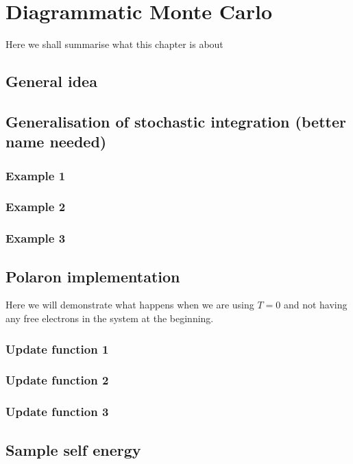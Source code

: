 \documentclass[12pt]{report}
\newcommand{\todo}[1]{{\leavevmode\color{todo}#1}}
\begin{document}
\chapter{Diagrammatic Monte Carlo}

\todo{Here we shall summarise what this chapter is about}

\section{General idea}

\section{Generalisation of stochastic integration (better name needed)}

\subsection{Example 1}
\subsection{Example 2}
\subsection{Example 3}

\section{Polaron implementation}

\todo{Here we will demonstrate what happens when we are using $ T = 0 $ and not having any free electrons in the system at the beginning.}

\subsection{Update function 1}
\subsection{Update function 2}
\subsection{Update function 3}

\section{Sample self energy}
\end{document}
